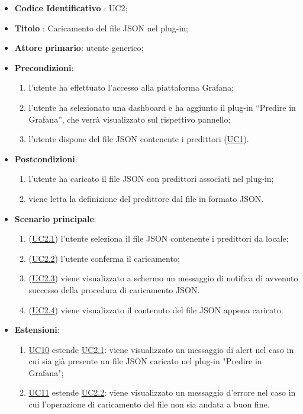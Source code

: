 		\begin{itemize}
			\item\textbf{Codice Identificativo} : UC2;
			\item\textbf{Titolo} : Caricamento del file JSON nel plug-in;
			\item\textbf{Attore primario}: utente generico;
			\item\textbf{Precondizioni}:
				\begin{enumerate}
					\item l'utente ha effettuato l'accesso alla piattaforma Grafana;
					\item l'utente ha selezionato una dashboard e ha aggiunto il plug-in “Predire in Grafana”, che verrà visualizzato sul rispettivo pannello;
					\item l'utente dispone del file JSON contenente i predittori (\hyperref[par:UC1]{UC1}).
				\end{enumerate}
			\item\textbf{Postcondizioni}:
				\begin{enumerate}
					\item l'utente ha caricato il file JSON con predittori associati nel plug-in;
					\item viene letta la definizione del predittore dal file in formato JSON.
				\end{enumerate}
			\item\textbf{Scenario principale}:
				\begin{enumerate}
					\item (\hyperref[par:UC2.1]{UC2.1}) l'utente seleziona il file JSON contenente i predittori da locale;
					\item (\hyperref[par:UC2.2]{UC2.2}) l'utente conferma il caricamento;
					\item (\hyperref[par:UC2.3]{UC2.3}) viene visualizzato a schermo un messaggio di notifica di avvenuto successo della procedura di caricamento JSON.
					\item (\hyperref[par:UC2.4]{UC2.4}) viene visualizzato il contenuto del file JSON appena caricato.
				\end{enumerate}
			\item\textbf{Estensioni}:
				\begin{enumerate}
					\item\hyperref[par:UC10]{UC10} estende \hyperref[par:UC2.1]{UC2.1}: viene visualizzato un messaggio di alert nel caso in cui sia già presente un file JSON caricato nel plug-in "Predire in Grafana";
					\item\hyperref[par:UC11]{UC11} estende \hyperref[par:UC2.2]{UC2.2}: viene visualizzato un messaggio d'errore nel caso in cui l'operazione di caricamento del file non sia andata a buon fine.
				\end{enumerate}	
			
		\end{itemize}
		
